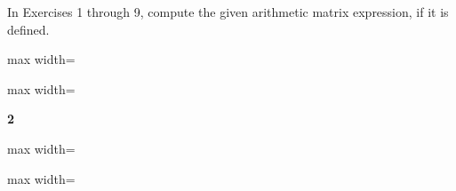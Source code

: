 \documentclass[11pt,oneside]{article}
\begin{document}
\begin{BookBody} \BookEnd{\blacksquare}


\noindent In Exercises 1 through 9, compute the given arithmetic matrix expression, if it is defined.

\begin{center}\begin{adjustbox}{max width=\linewidth}\end{adjustbox}\end{center}

\begin{center}\begin{adjustbox}{max width=\linewidth}\end{adjustbox}\end{center}

\noindent \textbf{2}

\begin{center}\begin{adjustbox}{max width=\linewidth}\end{adjustbox}\end{center}

\begin{center}\begin{adjustbox}{max width=\linewidth}\end{adjustbox}\end{center}


\end{BookBody}
\end{document}
